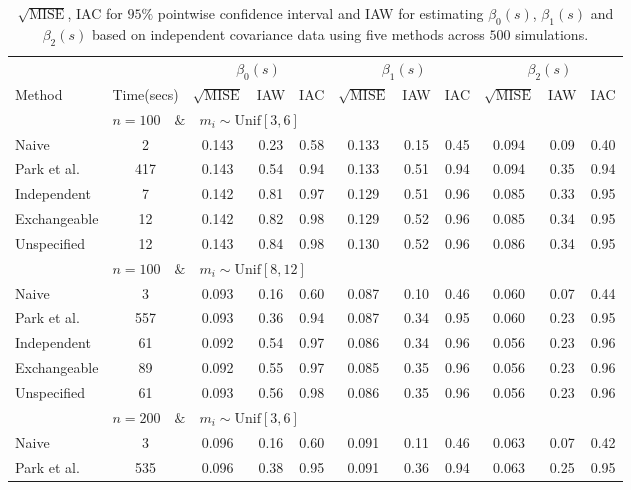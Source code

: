 \documentclass[submit]{smj}
\begin{document}
\begin{table}
	\centering
	\caption{$\sqrt{\text{MISE}}$,  IAC for $95\%$ pointwise confidence interval and IAW for estimating $\beta_0(s)$, $\beta_1(s)$ and $\beta_2(s)$ based on independent covariance data using five methods across $500$ simulations.}
	\label{tab:linear2}
	\begin{adjustbox}{width=\textwidth}
	\begin{tabular}{l|cccccccccc}
		\hline
		& & \multicolumn{3}{c}{$\beta_0(s)$} & \multicolumn{3}{c}{$\beta_1(s)$} &  \multicolumn{3}{c}{$\beta_2(s)$}    \\
		Method &Time(secs)& $\sqrt{\text{MISE}}$ & IAW &  IAC & $\sqrt{\text{MISE}}$ & IAW & IAC &  $\sqrt{\text{MISE}}$  & IAW &  IAC    \\
		\hline
		& \multicolumn{10}{l}{$n=100 \quad\& \quad m_i \sim  \text{Unif}[3,6]$}\\		
		Naive& 2& 0.143 & 0.23 & 0.58 & 0.133 & 0.15 & 0.45 & 0.094 & 0.09 & 0.40 \\ 
		Park et al. & 417 & 0.143 & 0.54 & 0.94 & 0.133 & 0.51 & 0.94 & 0.094 & 0.35 & 0.94 \\ 
		Independent & 7& 0.142 & 0.81 & 0.97 & 0.129 & 0.51 & 0.96 & 0.085 & 0.33 & 0.95 \\ 
		Exchangeable & 12& 0.142 & 0.82 & 0.98 & 0.129 & 0.52 & 0.96 & 0.085 & 0.34 & 0.95 \\ 
		Unspecified & 12& 0.143 & 0.84 & 0.98 & 0.130 & 0.52 & 0.96 & 0.086 & 0.34 & 0.95 \\
		& \multicolumn{10}{l}{$n=100 \quad\& \quad m_i \sim \text{Unif}[8,12]$}\\
		Naive& 3& 0.093 & 0.16 & 0.60 & 0.087 & 0.10 & 0.46 & 0.060 & 0.07 & 0.44 \\ 
		Park et al.& 557& 0.093 & 0.36 & 0.94 & 0.087 & 0.34 & 0.95 & 0.060 & 0.23 & 0.95 \\ 
		Independent & 61& 0.092 & 0.54 & 0.97 & 0.086 & 0.34 & 0.96 & 0.056 & 0.23 & 0.96 \\ 
		Exchangeable& 89 & 0.092 & 0.55 & 0.97 & 0.085 & 0.35 & 0.96 & 0.056 & 0.23 & 0.96 \\ 
		Unspecified & 61& 0.093 & 0.56 & 0.98 & 0.086 & 0.35 & 0.96 & 0.056 & 0.23 & 0.96 \\ 
		& \multicolumn{10}{l}{$n=200 \quad\& \quad m_i \sim  \text{Unif}[3,6]$}\\
		Naive & 3& 0.096 & 0.16 & 0.60 & 0.091 & 0.11 & 0.46 & 0.063 & 0.07 & 0.42 \\ 
		Park et al.& 535& 0.096 & 0.38 & 0.95 & 0.091 & 0.36 & 0.94 & 0.063 & 0.25 & 0.95 \\ 

\end{tabular}
\end{adjustbox}
\end{table}
\end{document}
